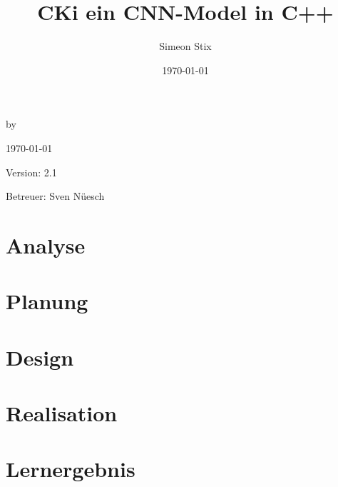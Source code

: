 \documentclass[a4paper,oneside,12pt]{report}
\title{CKi ein CNN-Model in C++}
\author{Simeon Stix}
\date{\today}
\renewcommand{\maketitle}{
\begin{titlepage}
    \begin{center}
        \vspace*{1cm}
        
        \Huge
        \textbf{\thetitle}
        
        \vspace{0.5cm}
        \Large
        by \theauthor
        
        \vspace{1.5cm}
        
        \today
        
        \vfill
        
        Version: 2.1
        
        \vspace{1cm}
        
        Betreuer: Sven Nüesch
        
    \end{center}
\end{titlepage}
}
\begin{document}
\maketitle

\tableofcontents %
\cleardoublepage %

\pagestyle{plain} %

\chapter{Analyse}
\label{sec:Analyse}


\chapter{Planung}
\label{sec:Planung}


\chapter{Design}
\label{sec:Design}


\chapter{Realisation}
\label{sec:Realisation}


\chapter{Lernergebnis}
\label{sec:Auftrag}




\clearpage
{}
\nocite{*} %

\clearpage
{}
\listoffigures



\end{document}
